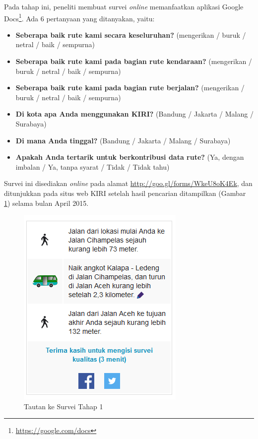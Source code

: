 Pada tahap ini, peneliti membuat survei \textit{online} memanfaatkan aplikasi Google Docs\footnote{\url{https://google.com/docs}}. Ada 6 pertanyaan yang ditanyakan, yaitu:

\begin{itemize}
	\item \textbf{Seberapa baik rute kami secara keseluruhan?} (mengerikan / buruk / netral / baik / sempurna)
	\item \textbf{Seberapa baik rute kami pada bagian rute kendaraan?} (mengerikan / buruk / netral / baik / sempurna)
	\item \textbf{Seberapa baik rute kami pada bagian rute berjalan?} (mengerikan / buruk / netral / baik / sempurna)
	\item \textbf{Di kota apa Anda menggunakan KIRI?} (Bandung / Jakarta / Malang / Surabaya)
	\item \textbf{Di mana Anda tinggal?} (Bandung / Jakarta / Malang / Surabaya)
	\item \textbf{Apakah Anda tertarik untuk berkontribusi data rute?} (Ya, dengan imbalan / Ya, tanpa syarat / Tidak / Tidak tahu)
\end{itemize}

Survei ini disediakan \textit{online} pada alamat \url{http://goo.gl/forms/WkeU8oK4Ek}, dan ditunjukkan pada situs web KIRI setelah hasil pencarian ditampilkan (Gambar \ref{fig:5_survei_1}) selama bulan April 2015.

\begin{figure}
	\centering
	\includegraphics[scale=0.75]{Gambar/5_survei_1}
	\caption{Tautan ke Survei Tahap 1} 
	\label{fig:5_survei_1}
\end{figure}

